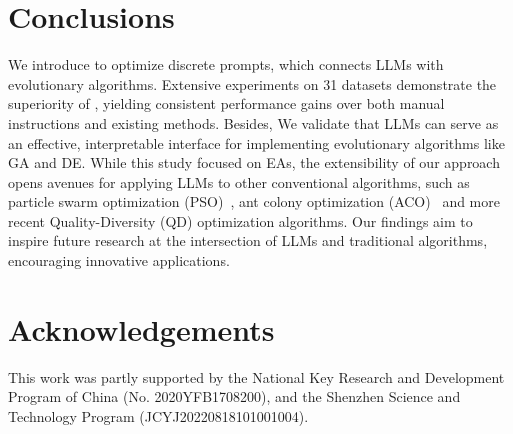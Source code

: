 \section{Conclusions}


We introduce \modelname to optimize discrete prompts, which connects LLMs with evolutionary algorithms. Extensive experiments on 31 datasets demonstrate the superiority of \modelname, yielding consistent performance gains over both manual instructions and existing methods. Besides, We validate that LLMs can serve as an effective, interpretable interface for implementing evolutionary algorithms like GA and DE. 
While this study focused on EAs, the extensibility of our approach opens avenues for applying LLMs to other conventional algorithms, such as particle swarm optimization (PSO)~\citep{kennedy1995particle}, ant colony optimization (ACO)~\citep{dorigo1997ant} and more recent Quality-Diversity (QD) optimization algorithms.
Our findings aim to inspire future research at the intersection of LLMs and traditional algorithms, encouraging innovative applications.

\section*{Acknowledgements}
This work was partly supported by the National Key Research and Development Program of China (No. 2020YFB1708200), and the Shenzhen Science and Technology Program (JCYJ20220818101001004).
